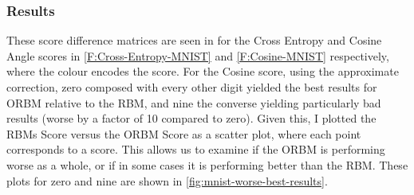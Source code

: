     \subsubsection{Results}
    These score difference matrices are seen in for the Cross Entropy and Cosine Angle scores in \ref{F:Cross-Entropy-MNIST} and \ref{F:Cosine-MNIST} respectively, where the colour encodes the score. For the Cosine score,  using the approximate correction, zero composed with every other digit yielded the best results for ORBM relative to the RBM, and nine the converse yielding particularly bad results (worse by a factor of 10 compared to zero). Given this, I plotted the RBMs Score versus the ORBM Score as a scatter plot, where each point corresponds to a score. This allows us to examine if the ORBM is performing worse as a whole, or if in some cases it is performing better than the RBM. These plots for zero and nine are shown in \ref{fig:mnist-worse-best-results}.
